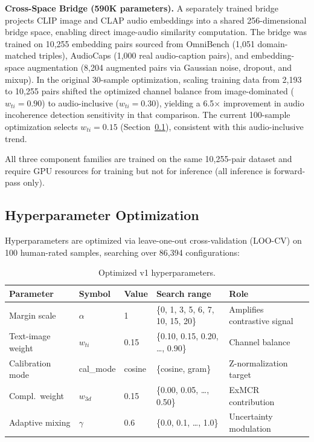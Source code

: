 \documentclass[a4paper,fleqn]{cas-sc}
\begin{document}
\begin{itemize}
\textbf{Cross-Space Bridge (590K parameters).} A separately trained bridge projects CLIP image and CLAP audio embeddings into a shared 256-dimensional bridge space, enabling direct image-audio similarity computation. The bridge was trained on 10,255 embedding pairs sourced from OmniBench (1,051 domain-matched triples), AudioCaps (1,000 real audio-caption pairs), and embedding-space augmentation (8,204 augmented pairs via Gaussian noise, dropout, and mixup). In the original 30-sample optimization, scaling training data from 2,193 to 10,255 pairs shifted the optimized channel balance from image-dominated ($w_{ti} = 0.90$) to audio-inclusive ($w_{ti} = 0.30$), yielding a 6.5$\times$ improvement in audio incoherence detection sensitivity in that comparison. The current 100-sample optimization selects $w_{ti} = 0.15$ (Section~\ref{sec:v1-hyperparams}), consistent with this audio-inclusive trend.


All three component families are trained on the same 10,255-pair dataset and require GPU resources for training but not for inference (all inference is forward-pass only).

\subsection{Hyperparameter Optimization}\label{sec:v1-hyperparams}

Hyperparameters are optimized via leave-one-out cross-validation (LOO-CV) on 100 human-rated samples, searching over 86,394 configurations:

\begin{table}[t]
\caption{Optimized v1 hyperparameters.}\label{tab:v1-hyperparams}
\centering
\small
\begin{tabular}{lllll}
\toprule
Parameter & Symbol & Value & Search range & Role \\
\midrule
Margin scale & $\alpha$ & 1 & \{0, 1, 3, 5, 6, 7, 10, 15, 20\} & Amplifies contrastive signal \\
Text-image weight & $w_{ti}$ & 0.15 & \{0.10, 0.15, 0.20, \ldots, 0.90\} & Channel balance \\
Calibration mode & cal\_mode & cosine & \{cosine, gram\} & Z-normalization target \\
Compl.\ weight & $w_{3d}$ & 0.15 & \{0.00, 0.05, \ldots, 0.50\} & ExMCR contribution \\
Adaptive mixing & $\gamma$ & 0.6 & \{0.0, 0.1, \ldots, 1.0\} & Uncertainty modulation \\
\bottomrule
\end{tabular}
\end{table}


\end{itemize}
\end{document}
